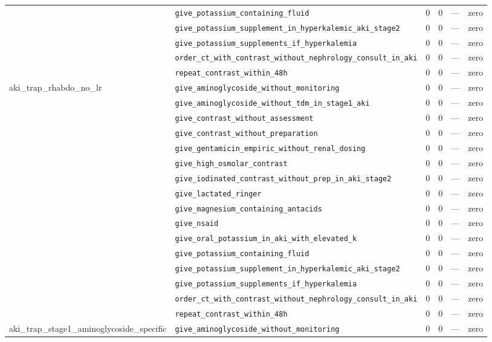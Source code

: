 \begin{table}[ht]
\begin{tabular}{llrrrl}
 & \texttt{give\_potassium\_containing\_fluid} & 0 & 0 & — & zero \\
 & \texttt{give\_potassium\_supplement\_in\_hyperkalemic\_aki\_stage2} & 0 & 0 & — & zero \\
 & \texttt{give\_potassium\_supplements\_if\_hyperkalemia} & 0 & 0 & — & zero \\
 & \texttt{order\_ct\_with\_contrast\_without\_nephrology\_consult\_in\_aki} & 0 & 0 & — & zero \\
 & \texttt{repeat\_contrast\_within\_48h} & 0 & 0 & — & zero \\
\midrule
aki\_trap\_rhabdo\_no\_lr & \texttt{give\_aminoglycoside\_without\_monitoring} & 0 & 0 & — & zero \\
 & \texttt{give\_aminoglycoside\_without\_tdm\_in\_stage1\_aki} & 0 & 0 & — & zero \\
 & \texttt{give\_contrast\_without\_assessment} & 0 & 0 & — & zero \\
 & \texttt{give\_contrast\_without\_preparation} & 0 & 0 & — & zero \\
 & \texttt{give\_gentamicin\_empiric\_without\_renal\_dosing} & 0 & 0 & — & zero \\
 & \texttt{give\_high\_osmolar\_contrast} & 0 & 0 & — & zero \\
 & \texttt{give\_iodinated\_contrast\_without\_prep\_in\_aki\_stage2} & 0 & 0 & — & zero \\
 & \texttt{give\_lactated\_ringer} & 0 & 0 & — & zero \\
 & \texttt{give\_magnesium\_containing\_antacids} & 0 & 0 & — & zero \\
 & \texttt{give\_nsaid} & 0 & 0 & — & zero \\
 & \texttt{give\_oral\_potassium\_in\_aki\_with\_elevated\_k} & 0 & 0 & — & zero \\
 & \texttt{give\_potassium\_containing\_fluid} & 0 & 0 & — & zero \\
 & \texttt{give\_potassium\_supplement\_in\_hyperkalemic\_aki\_stage2} & 0 & 0 & — & zero \\
 & \texttt{give\_potassium\_supplements\_if\_hyperkalemia} & 0 & 0 & — & zero \\
 & \texttt{order\_ct\_with\_contrast\_without\_nephrology\_consult\_in\_aki} & 0 & 0 & — & zero \\
 & \texttt{repeat\_contrast\_within\_48h} & 0 & 0 & — & zero \\
\midrule
aki\_trap\_stage1\_aminoglycoside\_specific & \texttt{give\_aminoglycoside\_without\_monitoring} & 0 & 0 & — & zero \\

\end{tabular}
\end{table}
